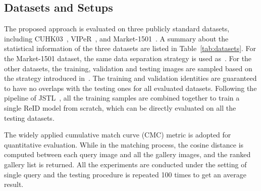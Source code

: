 \documentclass[10pt,twocolumn,letterpaper]{article}
\begin{document}
\subsection{Datasets and Setups}

The proposed approach is evaluated on three publicly standard datasets, including
CUHK03~\cite{li2014deepreid}, VIPeR~\cite{gray2007evaluating}, and Market-1501~\cite{zheng2015scalable}.
A summary about the statistical information of the three datasets are listed in Table~\ref{tab:datasets}.
For the Market-1501 dataset, the same data separation strategy is used as~\cite{zheng2015scalable}.
For the other datasets, the training, validation and testing images are sampled based on the strategy introduced in~\cite{xiao2016learning}.
The training and validation identities are guaranteed to have no overlaps with the testing ones for all evaluated datasets.
Following the pipeline of JSTL~\cite{xiao2016learning}, all the training samples are combined together to train a single ReID model from scratch, which can be directly evaluated on all the testing datasets.

The widely applied cumulative match curve (CMC) metric is adopted for quantitative evaluation.
While in the matching process, the cosine distance is computed between each query image and all the gallery images, and the ranked gallery list is returned.
All the experiments are conducted under the setting of single query and the testing procedure is repeated 100 times to get an average result.
\end{document}
